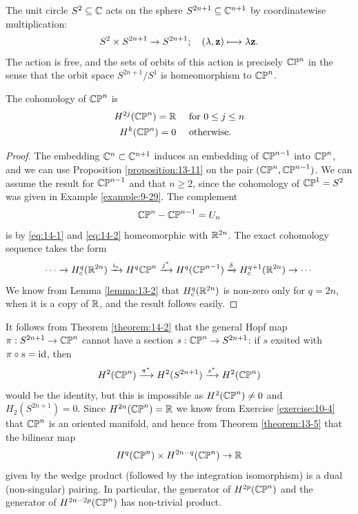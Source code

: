 The unit circle $S^2\subseteq{\ensuremath{\mathbb{C}}}$ acts on the sphere $S^{2n+1}\subseteq{\ensuremath{\mathbb{C}}}^{n+1}$ by coordinatewise 
multiplication:
\begin{align}\label{eq:14-6}
  S^2\times S^{2n+1}\to S^{2n+1};\quad 
  (\lambda, \mathbf{z}) \longmapsto \lambda\mathbf{z}.
\end{align}
The action is free, and the sets of orbits of this action is precisely $\mathbb{CP}^n$ in the sense 
that the orbit space $S^{2n+1}/S^1$ is homeomorphism to $\mathbb{CP}^n$. 


\begin{theorem}\label{theorem:14-2}
  The cohomology of $\mathbb{CP}^n$ is
  \begin{align*}
    H^{2j}(\mathbb{CP}^n) = {\mathbb{R}} \quad & \text{ for } 0\le j\le n\\
    H^k(\mathbb{CP}^n) = 0 \quad & \text{ otherwise. }
  \end{align*}
\end{theorem}

\begin{proof}
  The embedding ${\mathbb{C}}^n\subset{\ensuremath{\mathbb{C}}}^{n+1}$ induces an embedding of $\mathbb{CP}^{n-1}$ into $\mathbb{CP}^{n}$,
and we can use Proposition \ref{proposition:13-11} on the pair $(\mathbb{CP}^{n}, \mathbb{CP}^{n-1})$. We can 
assume the result for $\mathbb{CP}^{n-1}$ and that $n\ge 2$, since the cohomology of $\mathbb{CP}^{1}=S^2$ was given
in Example \ref{example:9-29}. The complement
\[
  \mathbb{CP}^{n}-\mathbb{CP}^{n-1} = U_n
\]
is by \eqref{eq:14-1} and \eqref{eq:14-2} homeomorphic with ${\mathbb{R}}^{2n}$. The exact cohomology sequence 
takes the form 
\[
  \cdots\ra H_c^q(\RR^{2n})
  \xra[i_*]H^q{\B{CP}^n}
  \xra[j^*]H^q(\B{CP}^{n-1})
  \xra[\delta]H_c^{q+1}(\RR^{2n})
  \ra\cdots
\]
We know from Lemma \ref{lemma:13-2} that $H_c^{q}({\mathbb{R}}^{2n})$ is non-zero only for $q=2n$, when it 
is a copy of ${\mathbb{R}}$, and the result follows easily.
\end{proof}

It follows from Theorem \ref{theorem:14-2} that the general Hopf map $\pi:S^{2n+1}\to\mathbb{CP}^n$ cannot 
have a section $s:\mathbb{CP}^n\to S^{2n+1}$: if $s$ exsited with $\pi\circ s=\operatorname{id}$, then 
\[
  H^2(\B{CP}^n)\xra[\pi^*]H^2(S^{2n+1})\xra[s^*]H^2(\B{CP}^n)
\]
would be the identity, but this is impossible as $H^2(\mathbb{CP}^n)\neq 0$ and $H_2(S^{2n+1})=0$.
Since $H^{2n}(\mathbb{CP}^n)={\mathbb{R}}$ we know from Exercise \ref{exercise:10-4} that $\mathbb{CP}^n$ is an oriented 
manifold, and hence from Theorem \ref{theorem:13-5} that the bilinear map 
\[
  H^q(\mathbb{CP}^n)\times H^{2n-q}(\mathbb{CP}^{n})\to {\ensuremath{\mathbb{R}}}
\]
given by the wedge product (followed by the integration isomorphism) is a dual
(non-singular) pairing. In particular, the generator of $H^{2p}(\mathbb{CP}^n)$ and the generator
of $H^{2n-2p}(\mathbb{CP}^n)$ has non-trivial product.

